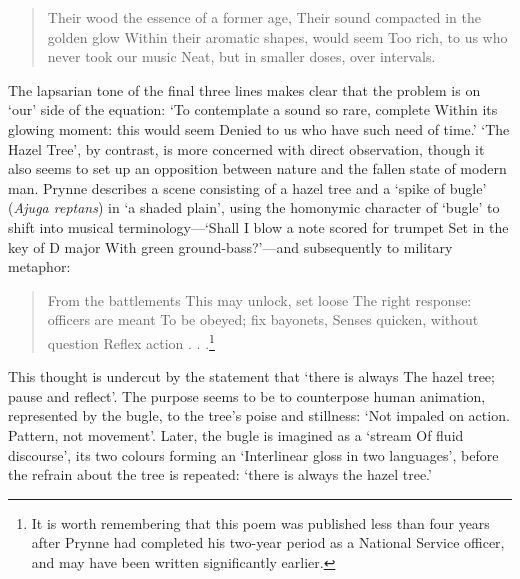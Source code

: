 \documentclass[]{article}
\begin{document}
\begin{quote}
Their wood the essence of a former age, Their sound compacted in the
golden glow Within their aromatic shapes, would seem Too rich, to us who
never took our music Neat, but in smaller doses, over intervals.
\end{quote}

The lapsarian tone of the final three lines makes clear that the problem
is on `our' side of the equation: `To contemplate a sound so rare,
complete \textbar{} Within its glowing moment: this would seem
\textbar{} Denied to us who have such need of time.' `The Hazel Tree',
by contrast, is more concerned with direct observation, though it also
seems to set up an opposition between nature and the fallen state of
modern man. Prynne describes a scene consisting of a hazel tree and a
`spike of bugle' (\emph{Ajuga reptans}) in `a shaded plain', using the
homonymic character of `bugle' to shift into musical
terminology---`Shall I blow a note scored for trumpet \textbar{} Set in
the key of D major \textbar{} With green ground-bass?'---and
subsequently to military metaphor:

\begin{quote}
From the battlements This may unlock, set loose The right response:
officers are meant To be obeyed; fix bayonets, Senses quicken, without
question Reflex action . . .\footnote{It is worth remembering that this
  poem was published less than four years after Prynne had completed his
  two-year period as a National Service officer, and may have been
  written significantly earlier.}
\end{quote}

This thought is undercut by the statement that `there is always
\textbar{} The hazel tree; pause and reflect'. The purpose seems to be
to counterpose human animation, represented by the bugle, to the tree's
poise and stillness: `Not impaled on action. \textbar{} Pattern, not
movement'. Later, the bugle is imagined as a `stream \textbar{} Of fluid
discourse', its two colours forming an `Interlinear gloss in two
languages', before the refrain about the tree is repeated: `there is
always the hazel tree.'
\end{document}
